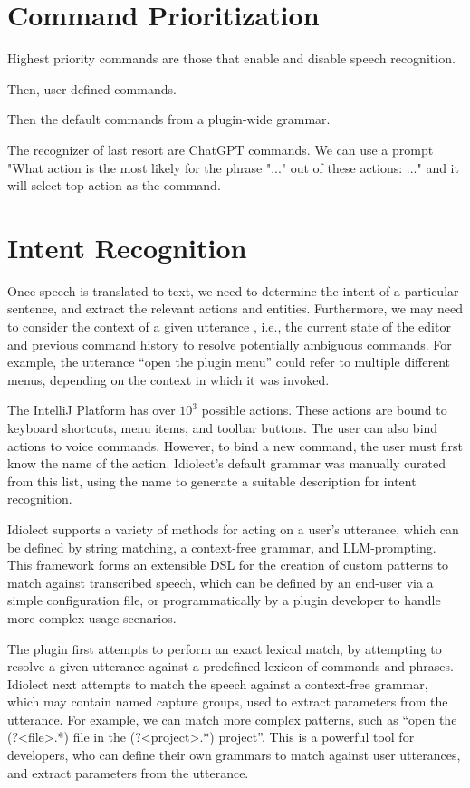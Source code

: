 \documentclass[conference]{IEEEtran}
\begin{document}
\section{Command Prioritization}

Highest priority commands are those that enable and disable speech recognition.

Then, user-defined commands.

Then the default commands from a plugin-wide grammar.

The recognizer of last resort are ChatGPT commands. We can use a prompt "What action is the most likely for the phrase "..." out of these actions: ..." and it will select top action as the command.

\section{Intent Recognition}

Once speech is translated to text, we need to determine the intent of a particular sentence, and extract the relevant actions and entities. Furthermore, we may need to consider the context of a given utterance , i.e., the current state of the editor and previous command history to resolve potentially ambiguous commands. For example, the utterance ``open the plugin menu'' could refer to multiple different menus, depending on the context in which it was invoked.

The IntelliJ Platform has over $10^3$ possible actions. These actions are bound to keyboard shortcuts, menu items, and toolbar buttons. The user can also bind actions to voice commands. However, to bind a new command, the user must first know the name of the action. Idiolect's default grammar was manually curated from this list, using the name to generate a suitable description for intent recognition.

Idiolect supports a variety of methods for acting on a user's utterance, which can be defined by string matching, a context-free grammar, and LLM-prompting. This framework forms an extensible DSL for the creation of custom patterns to match against transcribed speech, which can be defined by an end-user via a simple configuration file, or programmatically by a plugin developer to handle more complex usage scenarios.

The plugin first attempts to perform an exact lexical match, by attempting to resolve a given utterance against a predefined lexicon of commands and phrases. Idiolect next attempts to match the speech against a context-free grammar, which may contain named capture groups, used to extract parameters from the utterance. For example, we can match more complex patterns, such as ``open the (?<file>.*) file in the (?<project>.*) project''. This is a powerful tool for developers, who can define their own grammars to match against user utterances, and extract parameters from the utterance.
\end{document}

